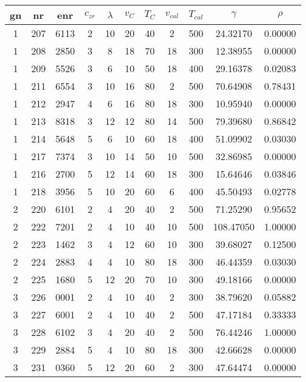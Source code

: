 \begin{table}[ht]
	\centering
	\label{tab:emma_all}
	\begin{tabular}{ccc|cccccc|cc}
        \hline\hline
		gn  &nr	    &enr	&$c_{zr}$	    &$\lambda$	&$v_{C}$	&$T_{C}$	&$v_{cal}$	&$T_{cal}$	&$\gamma$	&$\rho$\\
        \hline
        1   &207	&6113	&2	&10	&20	&40	&2	&500	&24.32170	&0.00000\\
        1   &208	&2850	&3	&8	&18	&70	&18	&300	&12.38955	&0.00000\\
        1   &209	&5526	&3	&6	&10	&50	&18	&400	&29.16378	&0.02083\\
        1   &211	&6554	&3	&10	&16	&80	&2	&500	&70.64908	&0.78431\\
        1   &212	&2947	&4	&6	&16	&80	&18	&300	&10.95940	&0.00000\\
        1   &213	&8318	&3	&12	&12	&80	&14	&500	&79.39680	&0.86842\\
        1   &214	&5648	&5	&6	&10	&60	&18	&400	&51.09902	&0.03030\\
        1   &217	&7374	&3	&10	&14	&50	&10	&500	&32.86985	&0.00000\\
        1   &216	&2700	&5	&12	&14	&60	&18	&300	&15.64646	&0.03846\\
        1   &218	&3956	&5	&10	&20	&60	&6	&400	&45.50493	&0.02778\\
                                                                           
        2   &220	&6101	&2	&4	&20	&40	&2	&500	&71.25290	&0.95652\\
        2   &222	&7201	&2	&4	&10	&40	&10	&500	&108.47050	&1.00000\\
        2   &223	&1462	&3	&4	&12	&60	&10	&300	&39.68027	&0.12500\\
        2   &224	&2883	&4	&4	&10	&80	&18	&300	&46.44359	&0.03030\\
        2   &225	&1680	&5	&12	&20	&70	&10	&300	&49.18166	&0.00000\\
                                                                           
        3   &226	&0001	&2	&4	&10	&40	&2	&300	&38.79620	&0.05882\\
        3   &227	&6001	&2	&4	&10	&40	&2	&500	&47.17184	&0.33333\\
        3   &228	&6102	&3	&4	&20	&40	&2	&500	&76.44246	&1.00000\\
        3   &229	&2884	&5	&4	&10	&80	&18	&300	&42.66628	&0.00000\\
        3   &231	&0360	&5	&12	&20	&60	&2	&300	&47.64474	&0.00000\\
                                                                           

\end{tabular}
\end{table}
